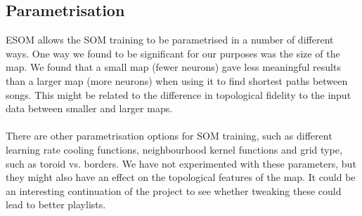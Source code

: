 \subsection{Parametrisation} %
\label{sub:parametrisation}

ESOM allows the SOM training to be parametrised in a number of different ways. One way we found to be significant for our purposes was the size of the map. We found that a small map (fewer neurons) gave less meaningful results than a larger map (more neurons) when using it to find shortest paths between songs. This might be related to the difference in topological fidelity to the input data between smaller and larger maps.
\\\\
There are other parametrisation options for SOM training, such as different learning rate cooling functions, neighbourhood kernel functions and grid type, such as toroid vs. borders. We have not experimented with these parameters, but they might also have an effect on the topological features of the map. It could be an interesting continuation of the project to see whether tweaking these could lead to better playlists.



